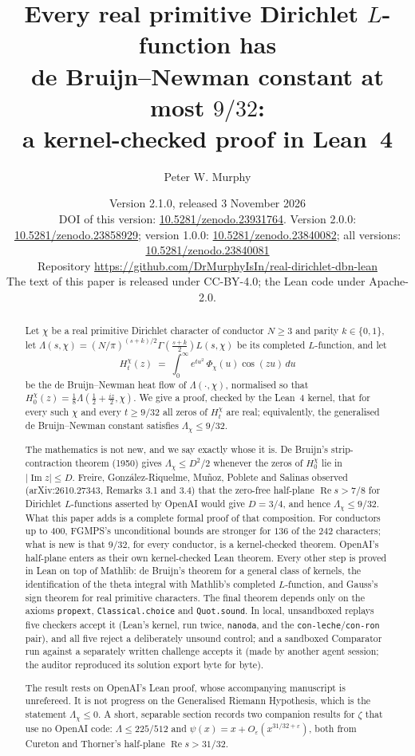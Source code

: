 \documentclass[11pt]{article}
\title{Every real primitive Dirichlet $L$-function has\\ de Bruijn--Newman constant at most $9/32$:\\ a kernel-checked proof in Lean~4}
\author{Peter W. Murphy}
\date{Version 2.1.0, released 3 November 2026\\[2pt]
\small DOI of this version: \href{https://doi.org/10.5281/zenodo.23931764}{10.5281/zenodo.23931764}. Version 2.0.0: \href{https://doi.org/10.5281/zenodo.23858929}{10.5281/zenodo.23858929}; version 1.0.0: \href{https://doi.org/10.5281/zenodo.23840082}{10.5281/zenodo.23840082}; all versions: \href{https://doi.org/10.5281/zenodo.23840081}{10.5281/zenodo.23840081}\\[2pt]
\small Repository \url{https://github.com/DrMurphyIsIn/real-dirichlet-dbn-lean}\\[2pt]
\small The text of this paper is released under CC-BY-4.0; the Lean code under Apache-2.0.}
\theoremstyle{definition}
\newcommand{\lean}[1]{\texttt{#1}}
\newcommand{\re}{\operatorname{Re}}
\newcommand{\im}{\operatorname{Im}}
\newcommand{\Lc}{\Lambda}
\begin{document}
\maketitle

\begin{abstract}
Let $\chi$ be a real primitive Dirichlet character of conductor $N \ge 3$ and parity $k \in \{0,1\}$, let $\Lc(s,\chi) = (N/\pi)^{(s+k)/2}\Gamma(\tfrac{s+k}{2})L(s,\chi)$ be its completed $L$-function, and let
\[
H^\chi_t(z) \;=\; \int_0^\infty e^{tu^2}\,\Phi_\chi(u)\cos(zu)\,du
\]
be the de Bruijn--Newman heat flow of $\Lc(\cdot,\chi)$, normalised so that $H^\chi_0(z) = \tfrac18\Lc(\tfrac12 + \tfrac{iz}{2},\chi)$. We give a proof, checked by the Lean~4 kernel, that for every such $\chi$ and every $t \ge 9/32$ all zeros of $H^\chi_t$ are real; equivalently, the generalised de Bruijn--Newman constant satisfies $\Lc_\chi \le 9/32$.

The mathematics is not new, and we say exactly whose it is. De Bruijn's strip-contraction theorem (1950) gives $\Lc_\chi \le D^2/2$ whenever the zeros of $H^\chi_0$ lie in $|\im z| \le D$. Freire, Gonz\'alez-Riquelme, Mu\~noz, Poblete and Salinas observed (arXiv:2610.27343, Remarks 3.1 and 3.4) that the zero-free half-plane $\re s > 7/8$ for Dirichlet $L$-functions asserted by OpenAI would give $D = 3/4$, and hence $\Lc_\chi \le 9/32$. What this paper adds is a complete formal proof of that composition. For conductors up to $400$, FGMPS's unconditional bounds are stronger for $136$ of the $242$ characters; what is new is that $9/32$, for every conductor, is a kernel-checked theorem. OpenAI's half-plane enters as their own kernel-checked Lean theorem. Every other step is proved in Lean on top of Mathlib: de Bruijn's theorem for a general class of kernels, the identification of the theta integral with Mathlib's completed $L$-function, and Gauss's sign theorem for real primitive characters. The final theorem depends only on the axioms \lean{propext}, \lean{Classical.choice} and \lean{Quot.sound}. In local, unsandboxed replays five checkers accept it (Lean's kernel, run twice, \lean{nanoda}, and the \lean{con-leche}/\lean{con-ron} pair), and all five reject a deliberately unsound control; and a sandboxed Comparator run against a separately written challenge accepts it (made by another agent session; the auditor reproduced its solution export byte for byte).

The result rests on OpenAI's Lean proof, whose accompanying manuscript is unrefereed. It is not progress on the Generalised Riemann Hypothesis, which is the statement $\Lc_\chi \le 0$. A short, separable section records two companion results for $\zeta$ that use no OpenAI code: $\Lc \le 225/512$ and $\psi(x) = x + O_\varepsilon(x^{31/32+\varepsilon})$, both from Cureton and Thorner's half-plane $\re s > 31/32$.


\end{abstract}
\end{document}
